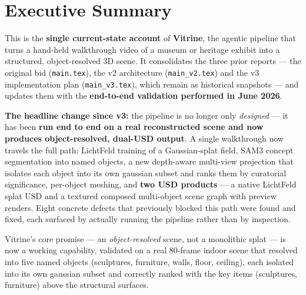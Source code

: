 \documentclass[a4paper,11pt]{report}
\newcommand{\code}[1]{\texttt{#1}}
\begin{document}

\chapter*{Executive Summary}

This is the \textbf{single current-state account} of \textbf{Vitrine}, the agentic pipeline that turns a
hand-held walkthrough video of a museum or heritage exhibit into a structured, object-resolved 3D scene.
It consolidates the three prior reports — the original bid (\code{main.tex}), the v2 architecture
(\code{main\_v2.tex}) and the v3 implementation plan (\code{main\_v3.tex}), which remain as historical
snapshots — and updates them with the \textbf{end-to-end validation performed in June 2026}.

\textbf{The headline change since v3:} the pipeline is no longer only \emph{designed} — it has been
\textbf{run end to end on a real reconstructed scene and now produces object-resolved, dual-USD output}.
A single walkthrough now travels the full path: LichtFeld training of a Gaussian-splat field, SAM3
concept segmentation into named objects, a new depth-aware multi-view projection that isolates each
object into its own gaussian subset and ranks them by curatorial significance, per-object meshing, and
\textbf{two USD products} — a native LichtFeld splat USD and a textured composed multi-object scene graph
with preview renders. Eight concrete defects that previously blocked this path were found and fixed, each
surfaced by actually running the pipeline rather than by inspection.

\begin{keyfinding}
Vitrine's core promise --- an \emph{object-resolved} scene, not a monolithic splat --- is now a working
capability, validated on a real 80-frame indoor scene that resolved into five named objects (sculptures,
furniture, walls, floor, ceiling), each isolated into its own gaussian subset and correctly ranked with
the key items (sculptures, furniture) above the structural surfaces.
\end{keyfinding}
\end{document}
